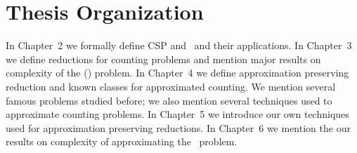\section{Thesis Organization}
In Chapter~2 we formally define CSP and \ccsp\ and their applications.
In Chapter~3 we define reductions for counting problems and mention major results
on complexity of the \ccsp(\mrelset) problem. In Chapter~4 we define approximation preserving
reduction and known classes for approximated counting. We mention several famous problems studied before;
we also mention several techniques used to approximate counting problems.
In Chapter~5 we introduce our own techniques used for approximation preserving reductions.
In Chapter~6 we mention the our results on complexity of approximating the \cbis\ problem.
